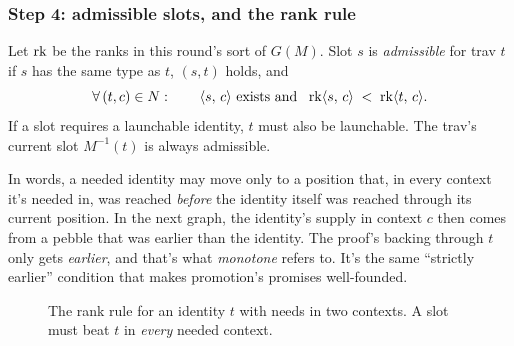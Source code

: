 \subsubsection{Step 4: admissible slots, and the rank rule}

\begin{definition}[Admissible]
Let $\operatorname{rk}$ be the ranks in this round's sort of $G(M)$. Slot $s$ is \emph{admissible} for trav $t$ if $s$ has the same type as $t$, $(s,t)$ holds, and
\[
  \forall\, (t,c)\in N:\qquad \langle s,\,c\rangle\text{ exists and }\ \operatorname{rk}\langle s,\,c\rangle \;<\; \operatorname{rk}\langle t,\,c\rangle.
\]
If a slot requires a launchable identity, $t$ must also be launchable. The trav's current slot $M^{-1}(t)$ is always admissible.
\end{definition}

\noindent In words, a needed identity may move only to a position that, in every context it's needed in, was reached \emph{before} the identity itself was reached through its current position. In the next graph, the identity's supply in context $c$ then comes from a pebble that was earlier than the identity. The proof's backing through $t$ only gets \emph{earlier}, and that's what \emph{monotone} refers to. It's the same ``strictly earlier'' condition that makes promotion's promises well-founded.

\begin{figure}[tbp]
\centering
{}
\caption{The rank rule for an identity $t$ with needs in two contexts. A slot must beat $t$ in \emph{every} needed context.}
\label{fig:rankrule}
\end{figure}


